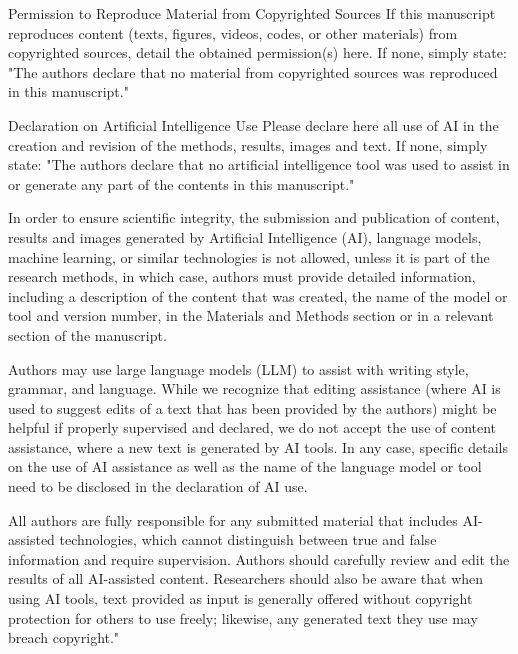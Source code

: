 \documentclass[titlepage]{geomorphica}
\begin{document}
\begin{closing}{Permission to Reproduce Material from Copyrighted Sources}
	If this manuscript reproduces content (texts, figures, videos, codes, or other materials) from copyrighted sources, detail the obtained permission(s) here. If none, simply state: "The authors declare that no material from copyrighted sources was reproduced in this manuscript."
\end{closing}
\begin{closing}{Declaration on Artificial Intelligence Use}
	Please declare here all use of AI in the creation and revision of the methods, results, images and text. If none, simply state: "The authors declare that no artificial intelligence tool was used to assist in or generate any part of the contents in this manuscript."

	In order to ensure scientific integrity, the submission and publication of content, results and images generated by Artificial Intelligence (AI), language models, machine learning, or similar technologies is not allowed, unless it is part of the research methods, in which case, authors must provide detailed information, including a description of the content that was created, the name of the model or tool and version number, in the Materials and Methods section or in a relevant section of the manuscript.
	
	Authors may use large language models (LLM) to assist with writing style, grammar, and language. While we recognize that editing assistance (where AI is used to suggest edits of a text that has been provided by the authors) might be helpful if properly supervised and declared, we do not accept the use of content assistance, where a new text is generated by AI tools. In any case, specific details on the use of AI assistance as well as the name of the language model or tool need to be disclosed in the declaration of AI use.

	All authors are fully responsible for any submitted material that includes AI-assisted technologies, which cannot distinguish between true and false information and require supervision. Authors should carefully review and edit the results of all AI-assisted content.
Researchers should also be aware that when using AI tools, text provided as input is generally offered without copyright protection for others to use freely; likewise, any generated text they use may breach copyright."
\end{closing}
\end{document}
